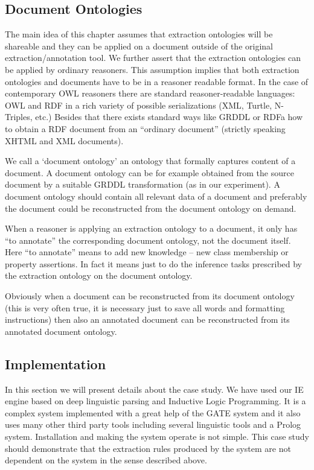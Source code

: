 \subsection{Document Ontologies} \label{sec:ch70_doc_ont}

The main idea of this chapter assumes that extraction ontologies will be shareable and they can be applied on a document outside of the original extraction/annotation tool. We further assert that the extraction ontologies can be applied by ordinary reasoners. This assumption implies that both extraction ontologies and documents have to be in a reasoner readable format. In the case of contemporary OWL reasoners there are standard reasoner-readable languages: OWL and RDF in a rich variety of possible serializations (XML, Turtle, N-Triples, etc.) Besides that there exists standard ways like GRDDL or RDFa how to obtain a RDF document from an ``ordinary document'' (strictly speaking XHTML and XML documents).

We call a `document ontology' an ontology that formally captures content of a document. A document ontology can be for example obtained from the source document by a suitable GRDDL transformation (as in our experiment). A document ontology should contain all relevant data of a document and preferably the document could be reconstructed from the document ontology on demand.

When a reasoner is applying an extraction ontology to a document, it only has ``to annotate'' the corresponding document ontology, not the document itself. Here ``to annotate'' means to add new knowledge -- new class membership or property assertions. In fact it means just to do the inference tasks prescribed by the extraction ontology on the document ontology. 

Obviously when a document can be reconstructed from its document ontology (this is very often true, it is necessary just to save all words and formatting instructions) then also an annotated document can be reconstructed from its annotated document ontology. 


\subsection{Implementation} \label{sec:implement}

In this section we will present details about the case study.  We have used our IE engine \citep{biblio:DedekISWC2010} based on deep linguistic parsing and Inductive Logic Programming. It is a complex system implemented with a great help of the GATE system \citep{biblio:GATE_ACL2002} and it also uses many other third party tools including several linguistic tools and a Prolog system. Installation and making the system operate is not simple. This case study should demonstrate that the extraction rules produced by the system are not dependent on the system in the sense described above.




